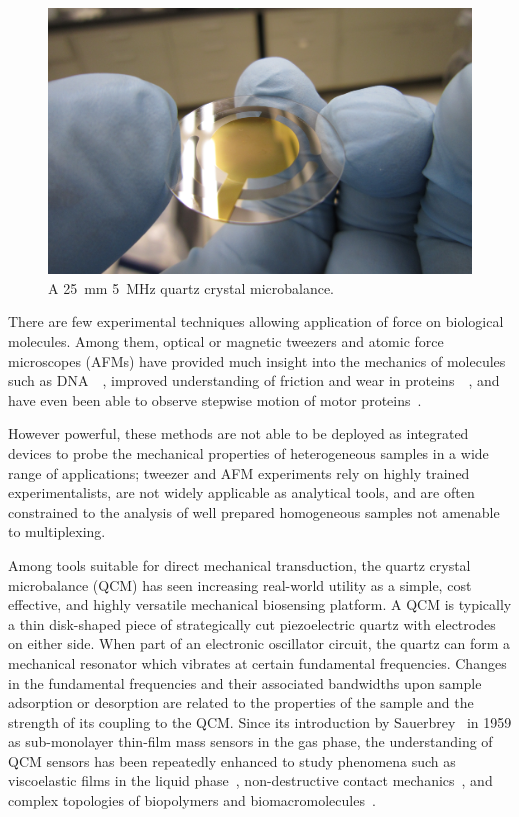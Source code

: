 \begin{figure}[ht]
 \centering
 \includegraphics[keepaspectratio,width=12cm]{qcm/figures/qcm_holding.jpg}
 \caption{A \SI{25}{\milli\meter} \SI{5}{\mega\hertz} quartz crystal microbalance.}
\label{fig:qcmholding}
\end{figure}
There are few experimental techniques allowing application of force
on biological molecules. Among them, optical or magnetic tweezers and
atomic force microscopes (AFMs) have provided much insight into the
mechanics of molecules such as
DNA~\cite{cui2000pulling}~\cite{marko1995stretching}, improved
understanding of friction and wear in
proteins~\cite{suda2001origin}~\cite{bormuth2009protein}, and have even
been able to observe stepwise motion of motor
proteins~\cite{asbury2003kinesin}.

However powerful, these methods are not able to be deployed as integrated
devices to probe the mechanical properties of heterogeneous samples in a
wide range of applications; tweezer and AFM experiments rely on highly
trained experimentalists, are not widely applicable as analytical tools,
and are often constrained to the analysis of well prepared homogeneous
samples not amenable to multiplexing.

Among tools suitable for direct mechanical transduction, the quartz crystal
microbalance (QCM) has seen increasing real-world utility as a simple, cost
effective, and highly versatile mechanical biosensing platform. A QCM is
typically a thin disk-shaped piece of strategically cut piezoelectric
quartz with electrodes on either side. When part of an electronic
oscillator circuit, the quartz can form a mechanical resonator which
vibrates at certain fundamental frequencies. Changes in the fundamental
frequencies and their associated bandwidths upon sample adsorption or
desorption are related to the properties of the sample and the strength of
its coupling to the QCM. Since its introduction by
Sauerbrey~\cite{sauerbrey1959verwendung} in 1959 as sub-monolayer thin-film
mass sensors in the gas phase, the understanding of QCM sensors has been
repeatedly enhanced to study phenomena such as viscoelastic films in the
liquid phase~\cite{kanazawa1985frequency}, non-destructive contact
mechanics~\cite{johannsman2007contacts}, and complex topologies of
biopolymers and biomacromolecules~\cite{marx2003quartz}.

